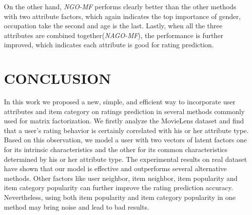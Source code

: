\documentclass{llncs}
\begin{document}
	On the other hand, \emph{NGO-MF} performs clearly better than
	the other methods with two attribute factors, which again indicates the top importance of
	gender, occupation take the second and age is the last. Lastly, when all the three attributes are
	combined together(\emph{NAGO-MF}), the performance is further improved, which indicates each
	attribute is good for rating prediction.
	
	\section{CONCLUSION}
	
	In this work we proposed a new, simple, and efficient way
	to incorporate user attributes and item category on ratings prediction in several methods
	commonly used for matrix factorization.
	We firstly analyze the MovieLens dataset and find that a user's rating behavior is certainly
	correlated with his or her attribute type.
	Based on this observation, we model a user with two vectors of latent factors one for its intrinsic characteristics and the other 	for its common characteristics determined by his or her attribute type.
	The experimental results on real dataset have shown that our
	model is effective and outperforms several alternative methods.
	Other factors like user neighbor, item neighbor, item popularity and item category popularity can further improve the rating prediction accuracy.
	Nevertheless, using both item popularity and item category popularity in one method may bring noise and lead to bad results.
	
	
	
\end{document}
